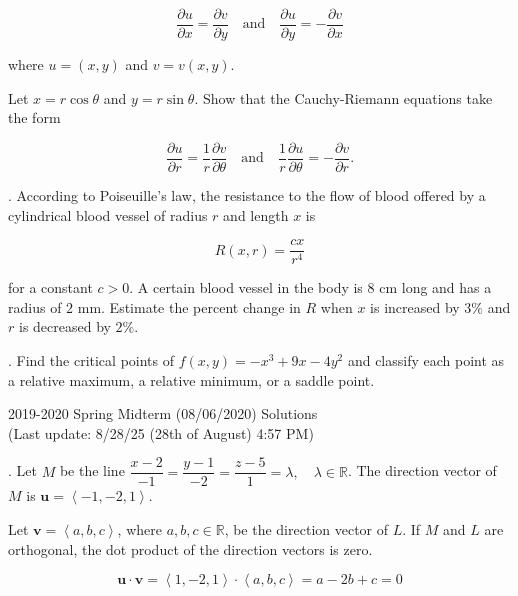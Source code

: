 \documentclass{article}
\begin{document}
\[\frac{\partial u}{\partial x}=\frac{\partial v}{\partial y}\quad\text{and}\quad\frac{\partial u}{\partial y}=-\frac{\partial v}{\partial x}\]

\hfill

\noindent where $u=(x,y)$ and $v=v(x,y)$.

\hfill

\noindent Let $x=r\cos\theta$ and $y=r\sin\theta$. Show that the Cauchy-Riemann equations take the form

\[\frac{\partial u}{\partial r} = \frac{1}{r} \frac{\partial v}{\partial\theta} \quad\text{and}\quad\frac1r\frac{\partial u}{\partial\theta}=-\frac{\partial v}{\partial r}.\]

\newpage

. According to Poiseuille’s law, the resistance to the flow of blood offered by a cylindrical blood vessel of radius $r$ and length $x$ is

\[R(x,r) = \frac{cx}{r^4}\]

\hfill

\noindent for a constant $c > 0$. A certain blood vessel in the body is 8 cm long and has a radius of $2$ mm. Estimate the percent change in $R$ when $x$ is increased by $3\%$ and $r$ is decreased by $2\%$.

\hfill

. Find the critical points of $f(x, y)=-x^3+9x-4y^2$ and classify each point as a relative maximum, a relative minimum, or a saddle point.

\newpage

\begin{center}
2019-2020 Spring Midterm (08/06/2020) Solutions\\
(Last update: 8/28/25 (28th of August) 4:57 PM)
\end{center}

. Let $M$ be the line $\dfrac{x-2}{-1}=\dfrac{y-1}{-2}=\dfrac{z-5}{1}=\lambda,\quad\lambda\in\mathbb{R}$. The direction vector of $M$ is $\mathbf u=\left\langle-1,-2,1\right\rangle$.

\hfill

\noindent Let $\mathbf v=\left\langle a,b,c\right\rangle$, where $a,b,c\in\mathbb R$, be the direction vector of $L$. If $M$ and $L$ are orthogonal, the dot product of the direction vectors is zero.

\[\mathbf u\cdot\mathbf v=\left\langle1,-2,1\right\rangle\cdot\left\langle a,b,c\right\rangle=a-2b+c=0\]

\hfill
\end{document}
